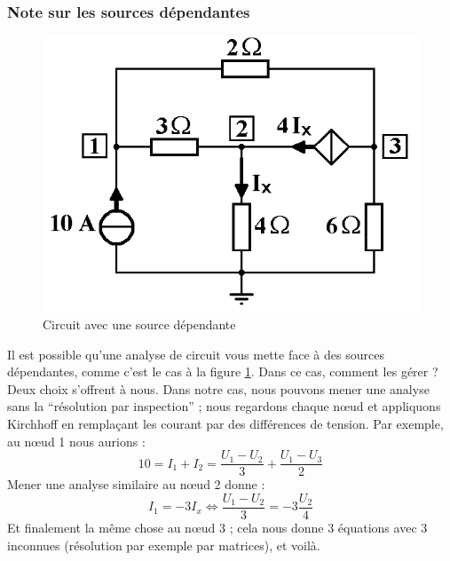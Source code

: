 \documentclass[12pt,a4paper]{article}
\begin{document}
\subsubsection[Sources dépendantes]{Note sur les sources dépendantes}
\label{subsubsection: note sources dependantes}
\begin{figure}
	\centering
	\includegraphics[scale=0.5]{images/nodale_source_dependante}
	\caption{Circuit avec une source dépendante}
	\label{fig: nodale source dependante}
\end{figure}
Il est possible qu'une analyse de circuit vous mette face à des sources dépendantes, comme c'est le cas à la figure \ref{fig: nodale source dependante}. Dans ce cas, comment les gérer ? Deux choix s'offrent à nous. Dans notre cas, nous pouvons mener une analyse sans la ``résolution par inspection'' ; nous regardons chaque n\oe ud et appliquons Kirchhoff en remplaçant les courant par des différences de tension. Par exemple, au n\oe ud 1 nous aurions :
\[10 = I_1 + I_2 = \frac{U_1-U_2}{3} + \frac{U_1-U_3}{2}\]
Mener une analyse similaire au n\oe ud 2 donne :
\[I_1 = -3I_x \iff \frac{U_1-U_2}{3} = -3\frac{U_2}{4}\]
Et finalement la même chose au n\oe ud 3 ; cela nous donne 3 équations avec 3 inconnues (résolution par exemple par matrices), et voilà.
\end{document}
